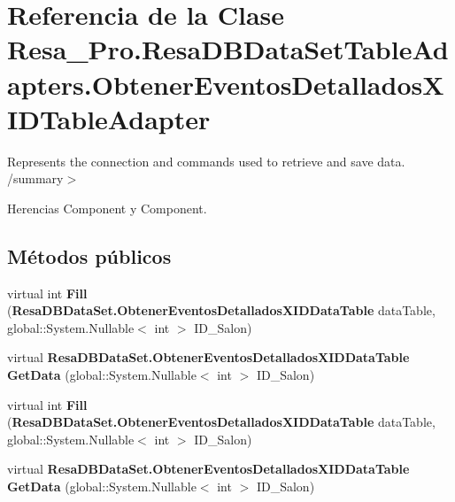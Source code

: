 \section{Referencia de la Clase Resa\+\_\+\+Pro.\+Resa\+D\+B\+Data\+Set\+Table\+Adapters.\+Obtener\+Eventos\+Detallados\+X\+I\+D\+Table\+Adapter}
\label{class_resa___pro_1_1_resa_d_b_data_set_table_adapters_1_1_obtener_eventos_detallados_x_i_d_table_adapter}


Represents the connection and commands used to retrieve and save data. /summary$>$  




Herencias Component y Component.

\subsection*{Métodos públicos}
\begin{DoxyCompactItemize}
\item 
virtual int {\bfseries Fill} ({\bf Resa\+D\+B\+Data\+Set.\+Obtener\+Eventos\+Detallados\+X\+I\+D\+Data\+Table} data\+Table, global\+::\+System.\+Nullable$<$ int $>$ I\+D\+\_\+\+Salon)\label{class_resa___pro_1_1_resa_d_b_data_set_table_adapters_1_1_obtener_eventos_detallados_x_i_d_table_adapter_ae5331bd37587c36fe7d0c4d7540baa2e}

\item 
virtual {\bf Resa\+D\+B\+Data\+Set.\+Obtener\+Eventos\+Detallados\+X\+I\+D\+Data\+Table} {\bfseries Get\+Data} (global\+::\+System.\+Nullable$<$ int $>$ I\+D\+\_\+\+Salon)\label{class_resa___pro_1_1_resa_d_b_data_set_table_adapters_1_1_obtener_eventos_detallados_x_i_d_table_adapter_aaec46c6f63a979e22474dec5da83f85c}

\item 
virtual int {\bfseries Fill} ({\bf Resa\+D\+B\+Data\+Set.\+Obtener\+Eventos\+Detallados\+X\+I\+D\+Data\+Table} data\+Table, global\+::\+System.\+Nullable$<$ int $>$ I\+D\+\_\+\+Salon)\label{class_resa___pro_1_1_resa_d_b_data_set_table_adapters_1_1_obtener_eventos_detallados_x_i_d_table_adapter_ae5331bd37587c36fe7d0c4d7540baa2e}

\item 
virtual {\bf Resa\+D\+B\+Data\+Set.\+Obtener\+Eventos\+Detallados\+X\+I\+D\+Data\+Table} {\bfseries Get\+Data} (global\+::\+System.\+Nullable$<$ int $>$ I\+D\+\_\+\+Salon)\label{class_resa___pro_1_1_resa_d_b_data_set_table_adapters_1_1_obtener_eventos_detallados_x_i_d_table_adapter_aaec46c6f63a979e22474dec5da83f85c}

\end{DoxyCompactItemize}
